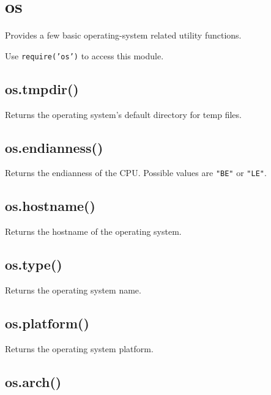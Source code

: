 \section{os}\label{os}

\begin{Shaded}
\begin{Highlighting}[]
 
\end{Highlighting}
\end{Shaded}

Provides a few basic operating-system related utility functions.

Use \texttt{require('os')} to access this module.

\subsection{os.tmpdir()}\label{os.tmpdir}

Returns the operating system's default directory for temp files.

\subsection{os.endianness()}\label{os.endianness}

Returns the endianness of the CPU. Possible values are \texttt{"BE"} or
\texttt{"LE"}.

\subsection{os.hostname()}\label{os.hostname}

Returns the hostname of the operating system.

\subsection{os.type()}\label{os.type}

Returns the operating system name.

\subsection{os.platform()}\label{os.platform}

Returns the operating system platform.

\subsection{os.arch()}\label{os.arch}

